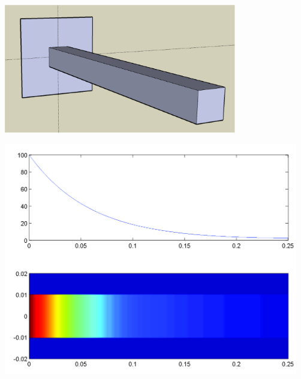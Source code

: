 \begin{center}
\begin{minipage}{4.0in}
\includegraphics[width=4.0in]{graphics/notes_06_LongPin3D}
\end{minipage}
\begin{minipage}{4.0in}
\begin{center}
\includegraphics[height=4.0in]{graphics/notes_06_FinTemperature1}
\end{center}
\end{minipage}
\end{center}
\newpage

